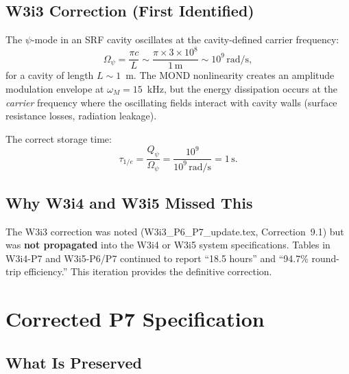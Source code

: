\documentclass[11pt]{article}
\theoremstyle{definition}
\theoremstyle{remark}
\newcommand{\ee}[1]{\times10^{#1}}
\newcommand{\Qpsi}{Q_\psi}
\newcommand{\Opsi}{\Omega_\psi}
\begin{document}
\subsection{W3i3 Correction (First Identified)}

The $\psi$-mode in an SRF cavity oscillates at the cavity-defined
carrier frequency:
\begin{equation}
\Opsi = \frac{\pi c}{L} \sim \frac{\pi \times 3\ee{8}}{1\,\mathrm{m}}
\sim 10^9\,\mathrm{rad/s},
\label{eq:Omega-carrier}
\end{equation}
for a cavity of length $L \sim 1$~m. The MOND nonlinearity creates an
amplitude modulation envelope at $\omega_M = 15$~kHz, but the energy
dissipation occurs at the \emph{carrier} frequency where the oscillating
fields interact with cavity walls (surface resistance losses, radiation
leakage).

The correct storage time:
\begin{equation}
\boxed{
\tau_{1/e} = \frac{\Qpsi}{\Opsi} = \frac{10^9}{10^9\,\mathrm{rad/s}}
= 1\,\mathrm{s}.
}
\label{eq:tau-correct}
\end{equation}

\subsection{Why W3i4 and W3i5 Missed This}

The W3i3 correction was noted (W3i3\_P6\_P7\_update.tex, Correction~9.1)
but was \textbf{not propagated} into the W3i4 or W3i5 system specifications.
Tables in W3i4-P7 and W3i5-P6/P7 continued to report ``18.5 hours'' and
``94.7\% round-trip efficiency.'' This iteration provides the definitive
correction.

\section{Corrected P7 Specification}
\label{sec:P7-spec}

\subsection{What Is Preserved}
\end{document}
